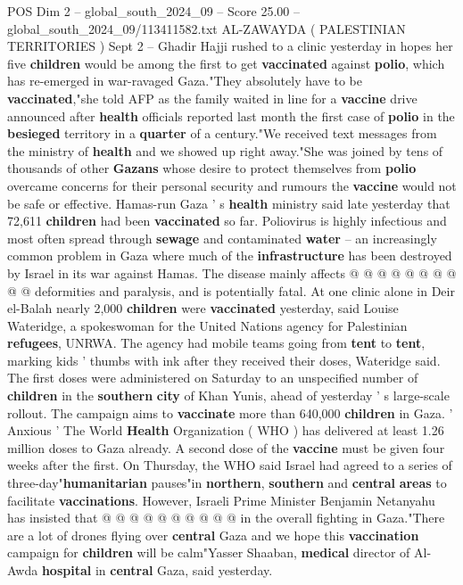 \begin{textsample}{POS Dim 2 – global\_south\_2024\_09 – Score 25.00 – global\_south\_2024\_09/113411582.txt}  \label{ex:f2_pos_195}
AL-ZAWAYDA ( PALESTINIAN TERRITORIES ) Sept 2 -- Ghadir Hajji rushed to a clinic yesterday in hopes her five \textbf{children} would be among the first to get \textbf{vaccinated} against \textbf{polio}, which has re-emerged in war-ravaged Gaza."They absolutely have to be \textbf{vaccinated},"she told AFP as the family waited in line for a \textbf{vaccine} drive announced after \textbf{health} officials reported last month the first case of \textbf{polio} in the \textbf{besieged} territory in a \textbf{quarter} of a century."We received text messages from the ministry of \textbf{health} and we showed up right away."She was joined by tens of thousands of other \textbf{Gazans} whose desire to protect themselves from \textbf{polio} overcame concerns for their personal security and rumours the \textbf{vaccine} would not be safe or effective.
Hamas-run Gaza ' s \textbf{health} ministry said late yesterday that 72,611 \textbf{children} had been \textbf{vaccinated} so far.
Poliovirus is highly infectious and most often spread through \textbf{sewage} and contaminated \textbf{water} -- an increasingly common problem in Gaza where much of the \textbf{infrastructure} has been destroyed by Israel in its war against Hamas.
The disease mainly affects @ @ @ @ @ @ @ @ @ @ deformities and paralysis, and is potentially fatal.
At one clinic alone in Deir el-Balah nearly 2,000 \textbf{children} were \textbf{vaccinated} yesterday, said Louise Wateridge, a spokeswoman for the United Nations agency for Palestinian \textbf{refugees}, UNRWA.
The agency had mobile teams going from \textbf{tent} to \textbf{tent}, marking kids ' thumbs with ink after they received their doses, Wateridge said.
The first doses were administered on Saturday to an unspecified number of \textbf{children} in the \textbf{southern} \textbf{city} of Khan Yunis, ahead of yesterday ' s large-scale rollout.
The campaign aims to \textbf{vaccinate} more than 640,000 \textbf{children} in Gaza. ' Anxious ' The World \textbf{Health} Organization ( WHO ) has delivered at least 1.26 million doses to Gaza already.
A second dose of the \textbf{vaccine} must be given four weeks after the first.
On Thursday, the WHO said Israel had agreed to a series of three-day"\textbf{humanitarian} pauses"in \textbf{northern}, \textbf{southern} and \textbf{central} \textbf{areas} to facilitate \textbf{vaccinations}.
However, Israeli Prime Minister Benjamin Netanyahu has insisted that @ @ @ @ @ @ @ @ @ @ in the overall fighting in Gaza."There are a lot of drones flying over \textbf{central} Gaza and we hope this \textbf{vaccination} campaign for \textbf{children} will be calm"Yasser Shaaban, \textbf{medical} director of Al-Awda \textbf{hospital} in \textbf{central} Gaza, said yesterday.

\end{textsample}
